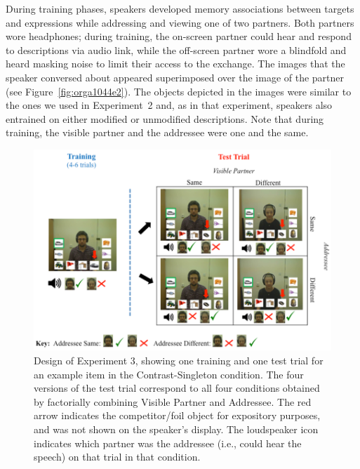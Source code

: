 \documentclass[natbib,man,a4paper]{apa6}
\begin{document}
During training phases, speakers developed memory associations between targets and expressions while addressing and viewing one of two partners. Both partners wore headphones; during training, the on-screen partner could hear and respond to descriptions via audio link, while the off-screen partner wore a blindfold and heard masking noise to limit their access to the exchange.  The images that the speaker conversed about appeared superimposed over the image of the partner (see Figure~\ref{fig:orga1044e2}). The objects depicted in the images were similar to the ones we used in Experiment~2 and, as in that experiment, speakers also entrained on either modified or unmodified descriptions. Note that during training, the visible partner and the addressee were one and the same.

\begin{figure}[htbp]
\centering
\includegraphics[width=.9\linewidth]{figs/Exp3_overview.png}
\caption{\label{fig:orga4cab06}
Design of Experiment 3, showing one training and one test trial for an example item in the Contrast-Singleton condition. The four versions of the test trial correspond to all four conditions obtained by factorially combining Visible Partner and Addressee. The red arrow indicates the competitor/foil object for expository purposes, and was not shown on the speaker's display.  The loudspeaker icon indicates which partner was the addressee (i.e., could hear the speech) on that trial in that condition.}
\end{figure}
\end{document}
